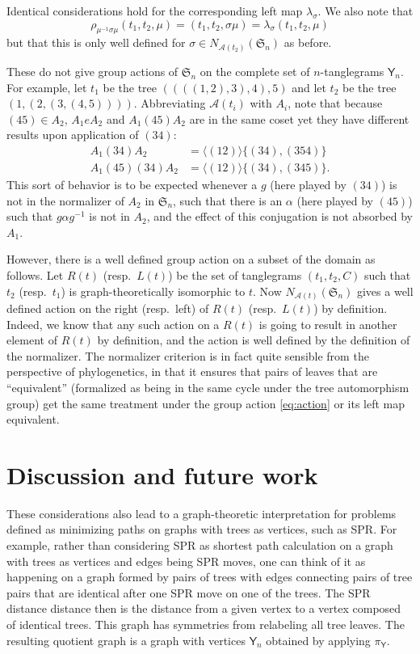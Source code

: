 \documentclass{amsart}
\newcommand{\fS}{\mathfrak S}
\newcommand{\aut}{\mathcal A}
\newcommand{\pairing}{\mu}
\newcommand{\tangle}{\mathsf{Y}}
\begin{document}
Identical considerations hold for the corresponding left map $\lambda_\sigma$.
We also note that
\[
\rho_{\pairing^{-1} \sigma \pairing} (t_1, t_2, \pairing) =
(t_1, t_2, \sigma \pairing) =
\lambda_{\sigma} (t_1, t_2, \pairing)
\]
but that this is only well defined for $\sigma \in N_{\aut(t_2)}(\fS_n)$ as before.

These do not give group actions of $\fS_n$ on the complete set of $n$-tanglegrams $\tangle_n$.
For example, let $t_1$ be the tree $((((1,2),3),4),5)$ and let $t_2$ be the tree $(1,(2,(3,(4,5))))$.
Abbreviating $\aut(t_i)$ with $A_i$, note that because $(4 5) \in A_2$, $A_1 e A_2$ and $A_1 (4 5) A_2$ are in the same coset yet they have different results upon application of $(3 4)$:
\begin{align*}
A_1 (3 4) A_2 & = \langle (1 2) \rangle \{(3 4), (3 5 4)\} \\
A_1 (4 5) (3 4) A_2 & = \langle (1 2) \rangle \{(3 4), (3 4 5)\}.
\end{align*}
This sort of behavior is to be expected whenever a $g$ (here played by $(3 4)$) is not in the normalizer of $A_2$ in $\fS_n$, such that there is an $\alpha$ (here played by $(4 5)$) such that $g \alpha g^{-1}$ is not in $A_2$, and the effect of this conjugation is not absorbed by $A_1$.

However, there is a well defined group action on a subset of the domain as follows.
Let $R(t)$ (resp.\ $L(t)$) be the set of tanglegrams $(t_1, t_2, C)$ such that $t_2$ (resp.\ $t_1$) is graph-theoretically isomorphic to $t$.
Now $N_{\aut(t)}(\fS_n)$ gives a well defined action on the right (resp.\ left) of $R(t)$ (resp.\ $L(t)$) by definition.
Indeed, we know that any such action on a $R(t)$ is going to result in another element of $R(t)$ by definition, and the action is well defined by the definition of the normalizer.
The normalizer criterion is in fact quite sensible from the perspective of phylogenetics, in that it ensures that pairs of leaves that are ``equivalent'' (formalized as being in the same cycle under the tree automorphism group) get the same treatment under the group action \eqref{eq:action} or its left map equivalent.


\section{Discussion and future work}
These considerations also lead to a graph-theoretic interpretation for problems defined as minimizing paths on graphs with trees as vertices, such as SPR.
For example, rather than considering SPR as shortest path calculation on a graph with trees as vertices and edges being SPR moves, one can think of it as happening on a graph formed by pairs of trees with edges connecting pairs of tree pairs that are identical after one SPR move on one of the trees.
The SPR distance distance then is the distance from a given vertex to a vertex composed of identical trees.
This graph has symmetries from relabeling all tree leaves.
The resulting quotient graph is a graph with vertices $\tangle_n$ obtained by applying $\pi_\tangle$.
\end{document}
